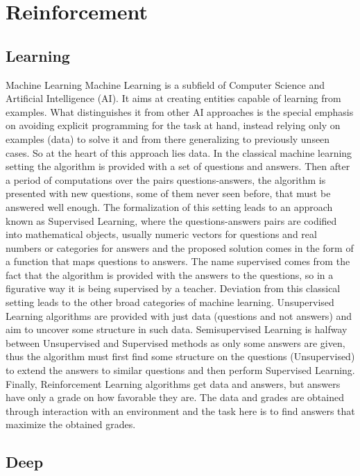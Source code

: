 \documentclass[
]{book}
\begin{document}
\hypertarget{reinforcement}{%
\chapter{Reinforcement}\label{reinforcement}}

\hypertarget{learning}{%
\section{Learning}\label{learning}}

Machine Learning
Machine Learning is a subfield of Computer Science and Artificial Intelligence (AI). It aims at creating entities capable of learning from examples. What distinguishes it from other AI approaches is the special emphasis on avoiding explicit programming for the task at hand, instead relying only on examples (data) to solve it and from there generalizing to previously unseen cases. So at the heart of this approach lies data.
In the classical machine learning setting the algorithm is provided with a set of questions and answers. Then after a period of computations over the pairs questions-answers, the algorithm is presented with new questions, some of them never seen before, that must be answered well enough.
The formalization of this setting leads to an approach known as Supervised Learning, where the questions-answers pairs are codified into mathematical objects, usually numeric vectors for questions and real numbers or categories for answers and the proposed solution comes in the form of a function that maps questions to answers. The name supervised comes from the fact that the algorithm is provided with the answers to the questions, so in a figurative way it is being supervised by a teacher.
Deviation from this classical setting leads to the other broad categories of machine learning. Unsupervised Learning algorithms are provided with just data (questions and not answers) and aim to uncover some structure in such data. Semisupervised Learning is halfway between Unsupervised and Supervised methods as only some answers are given, thus the algorithm must first find some structure on the questions (Unsupervised) to extend the answers to similar questions and then perform Supervised Learning. Finally, Reinforcement Learning algorithms get data and answers, but answers have only a grade on how favorable they are. The data and grades are obtained through interaction with an environment and the task here is to find answers that maximize the obtained grades.

\hypertarget{deep}{%
\section{Deep}\label{deep}}
\end{document}
